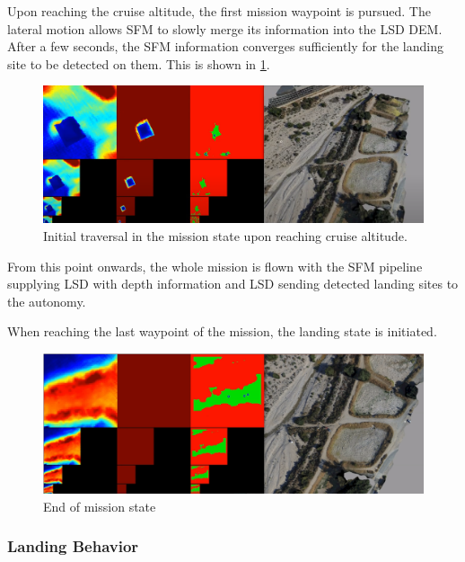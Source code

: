 Upon reaching the cruise altitude, the first mission waypoint is pursued. The lateral motion allows SFM to slowly merge its information into the LSD DEM. After a few seconds, the SFM information converges sufficiently for the landing site to be detected on them. This is shown in \cref{fig:demo_mission1}.

\begin{figure}[h]
\centering
\includegraphics[scale=0.25]{images/autonomous_landing/demo_flight/mission1.png}
\caption{Initial traversal in the mission state upon reaching cruise altitude.}
\label{fig:demo_mission1}
\end{figure}

From this point onwards, the whole mission is flown with the SFM pipeline supplying LSD with depth information and LSD sending detected landing sites to the autonomy.

When reaching the last waypoint of the mission, the landing state is initiated. 

\begin{figure}[h]
\centering
\includegraphics[scale=0.25]{images/autonomous_landing/demo_flight/mission_end.png}
\caption{End of mission state}
\label{fig:demo_mission_end}%
\end{figure}

\clearpage %
\subsubsection{Landing Behavior}

